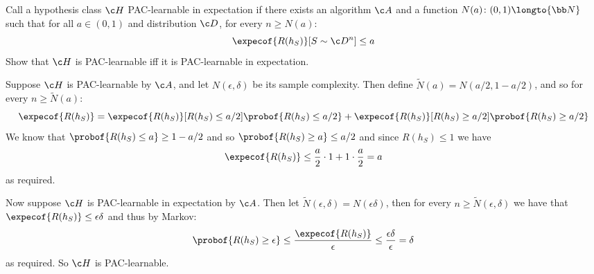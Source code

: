 \bexerc

    Call a hypothesis class $\c H$ {\emphcolor PAC-learnable in expectation} if there exists an algorithm $\c A$ and a function $N(a)\colon(0,1)\longto{\bb N}$ such that for all $a\in(0,1)$ and distribution
    $\c D$, for every $n\geq N(a)$:
    $$ \expecof{R(h_S)}[S\sim\c D^n] \leq a $$
    Show that $\c H$ is PAC-learnable iff it is PAC-learnable in expectation.

\eexerc

Suppose $\c H$ is PAC-learnable by $\c A$, and let $N(\epsilon,\delta)$ be its sample complexity.
Then define $\tilde N(a)=N(a/2,1-a/2)$, and so for every $n\geq \tilde N(a)$:
$$ \expecof{R(h_S)} = \expecof{R(h_S)}[R(h_S)\leq a/2]\probof{R(h_S)\leq a/2} + \expecof{R(h_S)}[R(h_S)\geq a/2]\probof{R(h_S)\geq a/2} $$
We know that $\probof{R(h_S)\leq a}\geq 1-a/2$ and so $\probof{R(h_S)\geq a}\leq a/2$ and since $R(h_S)\leq1$ we have
$$ \expecof{R(h_S)} \leq \frac a2\cdot1 + 1\cdot\frac a2 = a $$
as required.

Now suppose $\c H$ is PAC-learnable in expectation by $\c A$.
Then let $\tilde N(\epsilon,\delta)=N(\epsilon\delta)$, then for every $n\geq\tilde N(\epsilon,\delta)$ we have that $\expecof{R(h_S)}\leq\epsilon\delta$ and thus by Markov:
$$ \probof{R(h_S)\geq\epsilon} \leq \frac{\expecof{R(h_S)}}\epsilon \leq \frac{\epsilon\delta}\epsilon = \delta $$
as required.
So $\c H$ is PAC-learnable.

\bye

